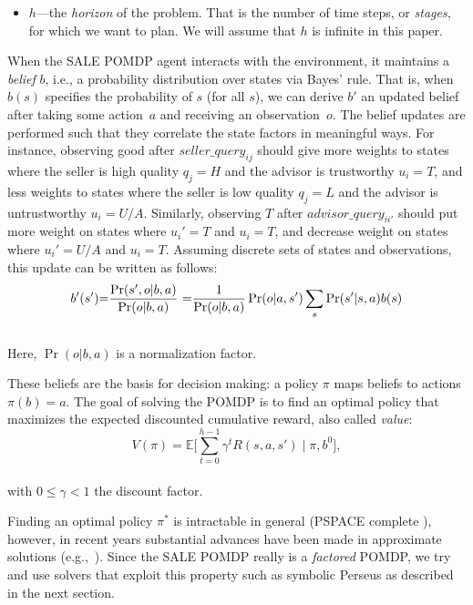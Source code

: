 \documentclass{aamas2013}
\providecommand{\E}{\mathbb{E}}
\providecommand{\SALEP}{SALE POMDP}
\begin{document}
\begin{itemize}
\item $h$---the \emph{horizon} of the problem. That is the number of time steps, or \emph{stages}, for which we want to plan. We will assume that $h$ is infinite in this paper.
\end{itemize}
When the \SALEP{} agent interacts with the environment, it maintains a \emph{belief} $b$, i.e., a probability distribution over states via Bayes' rule. That is, when $b(s)$ specifies the probability of $s$ (for all $s$), we can derive $b'$ an updated belief after taking some action~$a$ and receiving an observation~$o$.  The belief updates are performed such that they correlate the state factors in meaningful ways. For instance, observing good after $seller\_query_{ij}$ should give more weights to states where the seller is high quality $q_j = H$ and the advisor is trustworthy $u_i = T$, and less weights to states where the seller is low quality $q_j = L$ and the advisor is untrustworthy $u_i = U/A$.  Similarly, observing $T$ after $advisor\_query_{ii'}$ should put more weight on states where $u_i' = T$ and $u_i = T$, and decrease weight on states where $u_i' = U/A$ and $u_i = T$. Assuming discrete sets of states and observations, this update can be written as follows:
\begin{equation}
b'(s')\hspace{-1mm}=\hspace{-1mm}\frac{ \Pr(s',o|b,a) } {\Pr(o|b,a)}\
\hspace{-1mm}=\hspace{-1mm}\frac{1}{ \Pr(o|b,a) }
\Pr(o|a,s')
\sum_s
\Pr(s'|s,a)
b(s)
\label{eq:BU}
\end{equation}\\[-2mm]
Here, $\Pr(o|b,a)$ is a normalization factor. 

These beliefs are the basis for decision making: a policy $\pi$ maps beliefs to actions
$\pi(b)=a$. The goal of solving the POMDP is to find an optimal
policy that maximizes the expected discounted cumulative reward, also called
\emph{value}:\\[-2mm]
\begin{equation}
V(\pi)=\E\Big[\sum_{t=0}^{h-1} \gamma^t R(s,a,s') \mid \pi,b^0\Big],
\end{equation}\\[-3mm]
with $0\leq\gamma<1$ the discount factor.

Finding an optimal policy $\pi^*$ is intractable in general (PSPACE complete \cite{papadimitriou1987complexity}), however, in recent years substantial advances
have been made in approximate solutions (e.g.,~\cite{kurniawati2008sarsop,silver2010monte}). Since the \SALEP{} really is a \emph{factored} POMDP, we try and use solvers that exploit this property such as symbolic Perseus \cite{poupart2005exploiting} as described in the next section.
\end{document}
